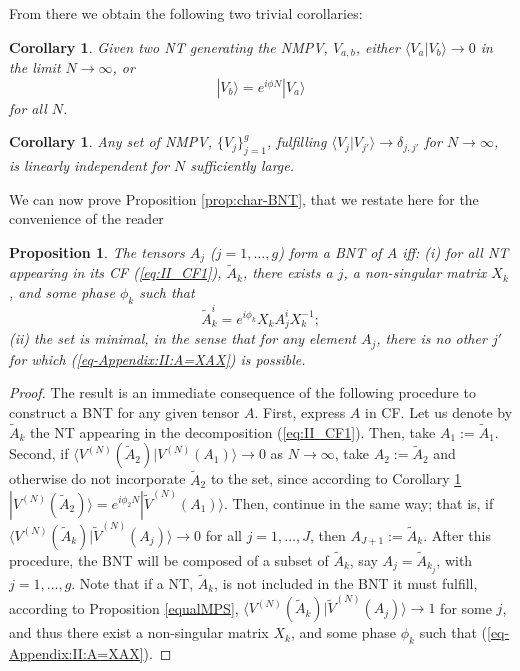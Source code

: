 \documentclass{elsarticle}
\newcommand{\be}{\begin{equation}}
\newcommand{\ee}{\end{equation}}
\newtheorem*{prop*}{Proposition}
\newtheorem{cor}[thm]{Corollary}
\begin{document}
From there we obtain the following two trivial corollaries:

\begin{cor}
    \label{eqV}
    Given two NT generating the NMPV, $V_{a,b}$, either $\langle V_a|V_b\rangle \to 0$ in the limit $N\to \infty$, or
    \be
        |V_b\rangle = e^{i\phi N} |V_a\rangle
    \ee
    for all $N$.
\end{cor}

\begin{cor}
    \label{Lem1}
    Any set of NMPV, $\{V_j\}_{j=1}^g$, fulfilling $\langle V_j|V_{j'}\rangle\to \delta_{j,j'}$ for $N\to\infty$, is linearly independent for $N$ sufficiently large.
\end{cor}

We can now prove Proposition \ref{prop:char-BNT}, that we restate here for the convenience of the reader

\begin{prop*}
    The tensors $A_j$ ($j=1,\ldots,g$) form a BNT of $A$ iff: (i) for all NT appearing in its CF (\ref{eq:II_CF1}), $\tilde A_k$, there exists a $j$, a non-singular matrix $X_k$, and some phase $\phi_k$ such that \be
    \label{eq-Appendix:II:A=XAX}
    \tilde A^i_k=e^{i\phi_k} X_k A^i_j X_k^{-1};
    \ee (ii) the set is minimal, in the sense that for any element $A_j$, there is no other $j'$ for which (\ref{eq-Appendix:II:A=XAX}) is possible.
\end{prop*}

\begin{proof}
    The result is an immediate consequence of the following procedure to construct a BNT for any given tensor $A$. First, express $A$ in CF. Let us denote by $\tilde A_k$ the NT appearing in the decomposition (\ref{eq:II_CF1}). Then, take $A_1:=\tilde A_1$. Second, if $\langle V^{(N)}(\tilde A_2)|V^{(N)}(A_1)\rangle\to 0$ as $N\to \infty$, take $A_2:=\tilde  A_2$ and otherwise do not incorporate $\tilde  A_2$ to the set, since according to Corollary \ref{eqV} $|V^{(N)}(\tilde A_2)\rangle = e^{i \phi_2 N} |\tilde V^{(N)}(A_1)\rangle$. Then, continue in the same way; that is, if $\langle V^{(N)}(\tilde A_k)|\tilde V^{(N)}(A_j)\rangle\to 0$ for all $j=1,\ldots,J$, then $A_{J+1}:=\tilde A_k$. After this procedure, the BNT will be composed of a subset of $\tilde A_k$, say $A_j=\tilde{A}_{k_j}$, with $j=1,\ldots,g$. Note that if a NT, $\tilde A_k$, is not included in the BNT it must fulfill, according to Proposition \ref{equalMPS}, $\langle V^{(N)}(\tilde A_k)|\tilde V^{(N)}(A_j)\rangle\to 1$ for some $j$, and thus there exist a non-singular matrix $X_k$, and some phase $\phi_k$ such that (\ref{eq-Appendix:II:A=XAX}).
\end{proof}
\end{document}
